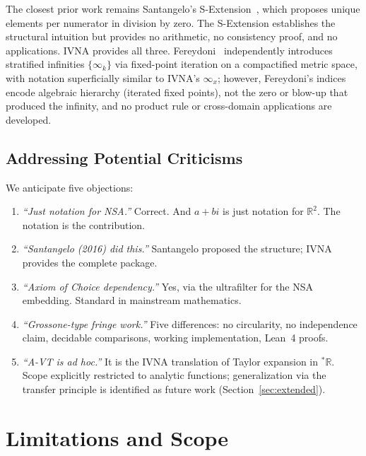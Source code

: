 \documentclass[12pt]{article}
\theoremstyle{definition}
\theoremstyle{remark}
\newcommand{\vi}[1]{\infty_{#1}}        %
\newcommand{\R}{\mathbb{R}}
\begin{document}
The closest prior work remains Santangelo's
S-Extension~\cite{santangelo2016}, which proposes unique elements per
numerator in division by zero. The S-Extension establishes the
structural intuition but provides no arithmetic, no consistency proof,
and no applications. IVNA provides all three.
Fereydoni~\cite{fereydoni2025} independently introduces stratified
infinities $\{\infty_k\}$ via fixed-point iteration on a compactified
metric space, with notation superficially similar to IVNA's
$\vi{x}$; however, Fereydoni's indices encode algebraic hierarchy
(iterated fixed points), not the zero or blow-up that produced the
infinity, and no product rule or cross-domain applications are
developed.

\subsection{Addressing Potential Criticisms}

We anticipate five objections:

\begin{enumerate}
\item \emph{``Just notation for NSA.''} Correct. And $a + bi$ is just
  notation for $\R^2$. The notation is the contribution.

\item \emph{``Santangelo (2016) did this.''} Santangelo proposed the
  structure; IVNA provides the complete package.

\item \emph{``Axiom of Choice dependency.''} Yes, via the ultrafilter
  for the NSA embedding. Standard in mainstream mathematics.

\item \emph{``Grossone-type fringe work.''} Five differences:
  no circularity, no independence claim, decidable comparisons,
  working implementation, Lean~4 proofs.

\item \emph{``A-VT is ad hoc.''} It is the IVNA translation of Taylor
  expansion in ${}^*\!\R$. Scope explicitly restricted to analytic
  functions; generalization via the transfer principle is identified
  as future work (Section~\ref{sec:extended}).
\end{enumerate}


\section{Limitations and Scope}
\label{sec:limitations}
\end{document}
